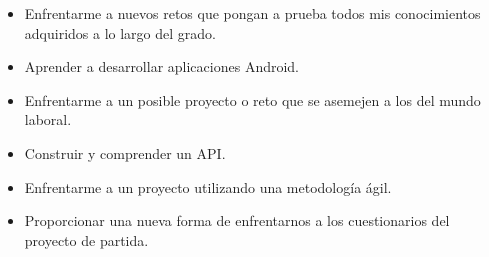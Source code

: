 \begin{itemize}
	
	\item Enfrentarme a nuevos retos que pongan a prueba todos mis conocimientos adquiridos a lo largo del grado.
	
	\item Aprender a desarrollar aplicaciones Android.
	
	\item Enfrentarme a un posible proyecto o reto que se asemejen a los del mundo laboral.
	
	\item Construir y comprender un API.
	
	\item Enfrentarme a un proyecto utilizando una metodología ágil.
	\item Proporcionar una nueva forma de enfrentarnos a los cuestionarios del proyecto de partida.

\end{itemize}




















